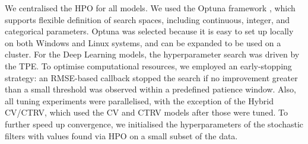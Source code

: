 
        We centralised the \ac{HPO} for all models. We used the Optuna framework \parencite{optuna_2019}, which supports flexible definition of search spaces, including continuous, integer, and categorical parameters. Optuna was selected because it is easy to set up locally on both Windows and Linux systems, and can be expanded to be used on a cluster.
        For the Deep Learning models, the hyperparameter search was driven by the \acf{TPE}.         
         To optimise computational resources, we employed an early-stopping strategy: an \acs{RMSE}-based callback stopped the search if no improvement greater than a small threshold was observed within a predefined patience window. Also, all tuning experiments were parallelised, with the exception of the Hybrid CV/CTRV, which used the \ac{CV} and \ac{CTRV} models after those were tuned.  %
         To further speed up convergence, we initialised the hyperparameters of the stochastic filters with values found via \ac{HPO} on a small subset of the data. %

